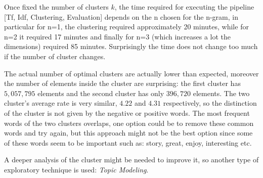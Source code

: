\documentclass[fleqn,10pt]{SelfArx}
\begin{document}
Once fixed the number of clusters $k$, the time required for executing the pipeline [Tf, Idf, Clustering, Evaluation] depends on the n chosen for the n-gram, in particular for n=1, the clustering required approximately 20 minutes, while for n=2 it required 17 minutes and finally for n=3 (which increases a lot the dimensions) required 85 minutes.
Surprisingly the time does not change too much if the number of cluster changes.

The actual number of optimal clusters are actually lower than expected, moreover the number of elements inside the cluster are surprising: the first cluster has $5,057,795$ elements and the second cluster has only $396,720$ elements.
The two cluster's average rate is very similar, $4.22$ and $4.31$ respectively, so the distinction of the cluster is not given by the negative or positive words.
The most frequent words of the two clusters overlaps, one option could be to remove these common words and try again, but this approach might not be the best option since some of these words seem to be important such as: story, great, enjoy, interesting etc.

A deeper analysis of the cluster might be needed to improve it, so another type of exploratory technique is used: \textit{Topic Modeling}.
\end{document}

